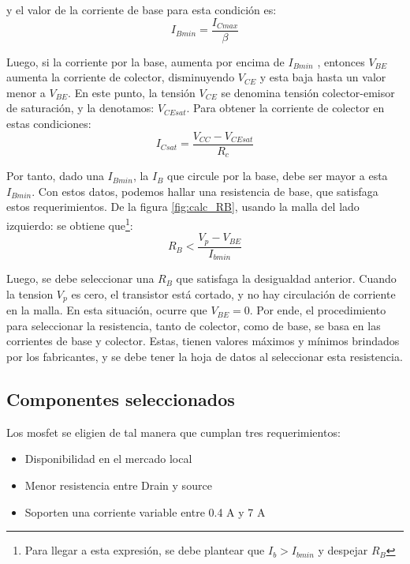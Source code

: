 y el valor de la corriente de base para esta condición es: 
\begin{equation}\label{eq:IB_min}
	I_{Bmin} = \frac{I_{Cmax}}{\beta}
\end{equation}

Luego, si la corriente por la base, aumenta por encima de $I_{Bmin}$ , entonces $V_{BE} $ aumenta la corriente de colector, disminuyendo $V_{CE}$   y esta baja hasta un valor menor a $V_{BE}$. En este punto, la tensión $V_{CE}$ se denomina tensión colector-emisor de saturación, y la denotamos: $V_{CEsat}$. Para obtener la corriente de colector en estas condiciones: 
\begin{equation} \label{eq:IC_sat}
	I_{Csat} = \frac{V_{CC}- V_{CEsat}}{R_c} 
\end{equation}

Por tanto, dado una $I_{Bmin}$, la $I_{B}$ que circule por la base, debe ser mayor a esta $I_{Bmin}$. Con estos datos, podemos hallar una resistencia de base, que satisfaga estos requerimientos. De la figura \ref{fig:calc_RB}, usando la malla del lado izquierdo:
se obtiene que\footnote{Para llegar a esta expresión, se debe plantear que $I_{b}>I_{bmin}$ y despejar $R_B$}: 
\begin{equation} \label{eq:select_rb}
	R_B < \frac{V_p-V_{BE}}{I_{bmin}}
\end{equation} 

Luego, se debe seleccionar una $R_B$ que satisfaga la desigualdad anterior.%
Cuando la tension $V_p$ es cero, el transistor está cortado, y no hay circulación de corriente en la malla. En esta situación, ocurre que $V_{BE}=0$. Por ende, el procedimiento para seleccionar la resistencia, tanto de colector, como de base, se basa en las corrientes de base y colector. Estas, tienen valores máximos y mínimos brindados por los fabricantes, y se debe tener la hoja de datos al seleccionar esta resistencia. 

\subsection{Componentes seleccionados} 


Los mosfet se eligien de tal manera que cumplan tres requerimientos:
\begin{itemize}
	\item Disponibilidad en el mercado local 
	\item Menor resistencia entre Drain y source 
	\item Soporten una corriente variable entre 0.4 A y 7 A   
	
\end{itemize}
 
